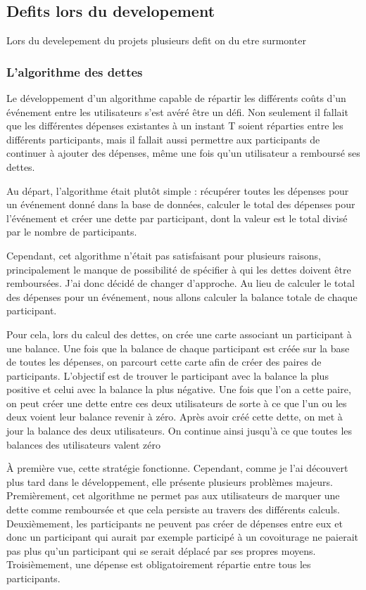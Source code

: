 \subsection{Defits lors du developement}\label{subsec:defits-lors-du-developement}
Lors du develepement du projets plusieurs defit on du etre surmonter

\subsubsection{L'algorithme des dettes}
Le développement d'un algorithme capable de répartir les différents coûts d'un événement entre les utilisateurs s'est avéré être un défi.
Non seulement il fallait que les différentes dépenses existantes à un instant T soient réparties entre les différents participants, mais il fallait aussi permettre aux participants de continuer à ajouter des dépenses, même une fois qu'un utilisateur a remboursé ses dettes.

Au départ, l'algorithme était plutôt simple : récupérer toutes les dépenses pour un événement donné dans la base de données, calculer le total des dépenses pour l'événement et créer une dette par participant, dont la valeur est le total divisé par le nombre de participants.

Cependant, cet algorithme n'était pas satisfaisant pour plusieurs raisons, principalement le manque de possibilité de spécifier à qui les dettes doivent être remboursées.
J'ai donc décidé de changer d'approche.
Au lieu de calculer le total des dépenses pour un événement, nous allons calculer la balance totale de chaque participant.

Pour cela, lors du calcul des dettes, on crée une carte associant un participant à une balance.
Une fois que la balance de chaque participant est créée sur la base de toutes les dépenses, on parcourt cette carte afin de créer des paires de participants.
L'objectif est de trouver le participant avec la balance la plus positive et celui avec la balance la plus négative.
Une fois que l'on a cette paire, on peut créer une dette entre ces deux utilisateurs de sorte à ce que l'un ou les deux voient leur balance revenir à zéro.
Après avoir créé cette dette, on met à jour la balance des deux utilisateurs.
On continue ainsi jusqu'à ce que toutes les balances des utilisateurs valent zéro

À première vue, cette stratégie fonctionne.
Cependant, comme je l'ai découvert plus tard dans le développement, elle présente plusieurs problèmes majeurs.
Premièrement, cet algorithme ne permet pas aux utilisateurs de marquer une dette comme remboursée et que cela persiste au travers des différents calculs.
Deuxièmement, les participants ne peuvent pas créer de dépenses entre eux et donc un participant qui aurait par exemple participé à un covoiturage ne paierait pas plus qu'un participant qui se serait déplacé par ses propres moyens.
Troisièmement, une dépense est obligatoirement répartie entre tous les participants.

